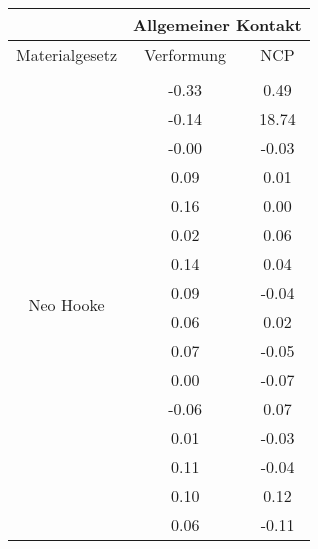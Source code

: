 \begin{table} 
\centering 
\begin{tabular}{c|cc|} 
\cline{2-3} 
 & \multicolumn{2}{|c|}{Allgemeiner Kontakt} \\ 
\hline 
\multicolumn{1}{|c|}{Materialgesetz} & \multicolumn{1}{c|}{Verformung} & \multicolumn{1}{c|}{NCP} \\ 
\hline 
\multicolumn{1}{|c|}{\multirow{32}{*}{Neo Hooke}} &\multicolumn{1}{|c|}{} & \multicolumn{1}{|c|}{} \\ 
\multicolumn{1}{|c|}{} & \multicolumn{1}{|c|}{     -0.33} & \multicolumn{1}{|c|}{      0.49} \\ 
\multicolumn{1}{|c|}{} & \multicolumn{1}{|c|}{     -0.14} & \multicolumn{1}{|c|}{     18.74} \\ 
\multicolumn{1}{|c|}{} & \multicolumn{1}{|c|}{     -0.00} & \multicolumn{1}{|c|}{     -0.03} \\ 
\multicolumn{1}{|c|}{} & \multicolumn{1}{|c|}{      0.09} & \multicolumn{1}{|c|}{      0.01} \\ 
\multicolumn{1}{|c|}{} & \multicolumn{1}{|c|}{      0.16} & \multicolumn{1}{|c|}{      0.00} \\ 
\multicolumn{1}{|c|}{} & \multicolumn{1}{|c|}{      0.02} & \multicolumn{1}{|c|}{      0.06} \\ 
\multicolumn{1}{|c|}{} & \multicolumn{1}{|c|}{      0.14} & \multicolumn{1}{|c|}{      0.04} \\ 
\multicolumn{1}{|c|}{} & \multicolumn{1}{|c|}{      0.09} & \multicolumn{1}{|c|}{     -0.04} \\ 
\multicolumn{1}{|c|}{} & \multicolumn{1}{|c|}{      0.06} & \multicolumn{1}{|c|}{      0.02} \\ 
\multicolumn{1}{|c|}{} & \multicolumn{1}{|c|}{      0.07} & \multicolumn{1}{|c|}{     -0.05} \\ 
\multicolumn{1}{|c|}{} & \multicolumn{1}{|c|}{      0.00} & \multicolumn{1}{|c|}{     -0.07} \\ 
\multicolumn{1}{|c|}{} & \multicolumn{1}{|c|}{     -0.06} & \multicolumn{1}{|c|}{      0.07} \\ 
\multicolumn{1}{|c|}{} & \multicolumn{1}{|c|}{      0.01} & \multicolumn{1}{|c|}{     -0.03} \\ 
\multicolumn{1}{|c|}{} & \multicolumn{1}{|c|}{      0.11} & \multicolumn{1}{|c|}{     -0.04} \\ 
\multicolumn{1}{|c|}{} & \multicolumn{1}{|c|}{      0.10} & \multicolumn{1}{|c|}{      0.12} \\ 
\multicolumn{1}{|c|}{} & \multicolumn{1}{|c|}{      0.06} & \multicolumn{1}{|c|}{     -0.11} \\ 

\end{tabular}
\end{table}
